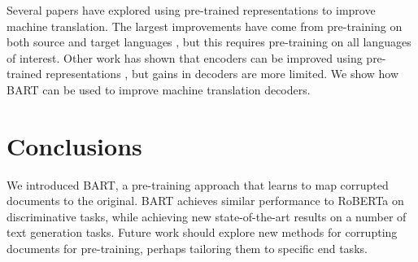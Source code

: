 \documentclass{article} %
\begin{document}
Several papers have explored using pre-trained representations to improve machine translation. The largest improvements have come from pre-training on both source and target languages \citep{mass,xlm}, but this requires pre-training on all languages of interest. Other work has shown that encoders can be improved using pre-trained representations \cite{edunov2019pre}, but gains in decoders are more limited. We show how BART can be used to improve machine translation decoders.



\section{Conclusions}
We introduced BART, a pre-training approach that learns to map corrupted documents to the original. 
BART achieves similar performance to RoBERTa on discriminative tasks, while achieving new state-of-the-art results on a number of text generation tasks. Future work should explore new methods for corrupting documents for pre-training, perhaps tailoring them to specific end tasks.

\clearpage





\end{document}
